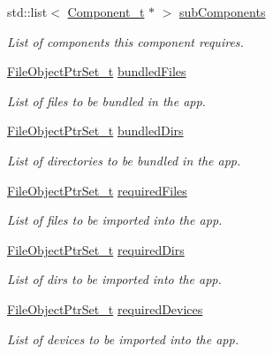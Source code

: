 \begin{DoxyCompactItemize}
std\+::list$<$ \hyperlink{structmodel_1_1_component__t}{Component\+\_\+t} $\ast$ $>$ \hyperlink{structmodel_1_1_component__t_aee49d6a29c34707c7d895596be91b448}{sub\+Components}
\begin{DoxyCompactList}\small\item\em List of components this component requires. \end{DoxyCompactList}\item 
\hyperlink{namespacemodel_aa2a6601c8a948122114a53c1aa584a23}{File\+Object\+Ptr\+Set\+\_\+t} \hyperlink{structmodel_1_1_component__t_aa433094e072dc63c58bff4f39a361401}{bundled\+Files}
\begin{DoxyCompactList}\small\item\em List of files to be bundled in the app. \end{DoxyCompactList}\item 
\hyperlink{namespacemodel_aa2a6601c8a948122114a53c1aa584a23}{File\+Object\+Ptr\+Set\+\_\+t} \hyperlink{structmodel_1_1_component__t_af841f6513fcff3ddabbc73085411ef51}{bundled\+Dirs}
\begin{DoxyCompactList}\small\item\em List of directories to be bundled in the app. \end{DoxyCompactList}\item 
\hyperlink{namespacemodel_aa2a6601c8a948122114a53c1aa584a23}{File\+Object\+Ptr\+Set\+\_\+t} \hyperlink{structmodel_1_1_component__t_a0946dba5a68d1a91ef39df0ce598c7bd}{required\+Files}
\begin{DoxyCompactList}\small\item\em List of files to be imported into the app. \end{DoxyCompactList}\item 
\hyperlink{namespacemodel_aa2a6601c8a948122114a53c1aa584a23}{File\+Object\+Ptr\+Set\+\_\+t} \hyperlink{structmodel_1_1_component__t_a4325259f17dd85ae9870769a374ccdb3}{required\+Dirs}
\begin{DoxyCompactList}\small\item\em List of dirs to be imported into the app. \end{DoxyCompactList}\item 
\hyperlink{namespacemodel_aa2a6601c8a948122114a53c1aa584a23}{File\+Object\+Ptr\+Set\+\_\+t} \hyperlink{structmodel_1_1_component__t_aa139617cacf2bdf7402f05c50a935124}{required\+Devices}
\begin{DoxyCompactList}\small\item\em List of devices to be imported into the app. \end{DoxyCompactList}\item 

\end{DoxyCompactItemize}
